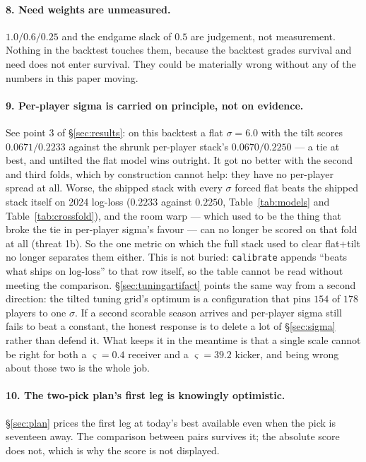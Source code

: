 \documentclass[10pt,a4paper]{article}
\theoremstyle{plain}
\theoremstyle{definition}
\theoremstyle{remark}
\newcommand{\code}[1]{\texttt{\small #1}}
\begin{document}
\paragraph{8. Need weights are unmeasured.}
$1.0 / 0.6 / 0.25$ and the endgame slack of $0.5$ are judgement, not measurement. Nothing
in the backtest touches them, because the backtest grades survival and need does not enter
survival. They could be materially wrong without any of the numbers in this paper moving.

\paragraph{9. Per-player sigma is carried on principle, not on evidence.}
See point 3 of \S\ref{sec:results}: on this backtest a flat $\sigma = 6.0$ with the tilt
scores $0.0671 / 0.2233$ against the shrunk per-player stack's $0.0670 / 0.2250$ --- a
tie at best, and untilted the flat model wins outright. It got no better with the second
and third folds, which by construction cannot help: they have no per-player spread at all.
Worse, the shipped stack with every $\sigma$ forced flat beats the shipped stack itself on
2024 log-loss ($0.2233$ against $0.2250$, Table~\ref{tab:models} and
Table~\ref{tab:crossfold}), and the room warp --- which used to be the thing that broke the
tie in per-player sigma's favour --- can no longer be scored on that fold at all (threat
1b). So the one metric on which the full stack used to clear flat+tilt no longer separates
them either. This is not buried: \code{calibrate} appends ``beats what ships on log-loss''
to that row itself, so the table cannot be read without meeting the comparison.
\S\ref{sec:tuningartifact}
points the same way from a second direction: the tilted tuning grid's optimum is a
configuration that pins $154$ of $178$ players to one $\sigma$. If a second scorable
season arrives and per-player sigma still fails to beat a constant, the honest response is
to delete a lot of \S\ref{sec:sigma} rather than defend it. What keeps it in the meantime
is that a single scale cannot be right for both a $\varsigma = 0.4$ receiver and a
$\varsigma = 39.2$ kicker, and being wrong about those two is the whole job.

\paragraph{10. The two-pick plan's first leg is knowingly optimistic.}
\S\ref{sec:plan} prices the first leg at today's best available even when the pick is
seventeen away. The comparison between pairs survives it; the absolute score does not,
which is why the score is not displayed.
\end{document}
